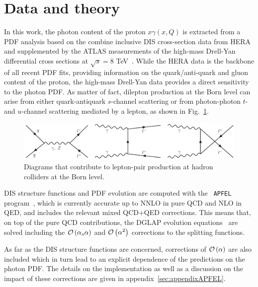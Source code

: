 \section{Data and theory}
\label{sec:theory}

In this work, the photon content of the proton $x\gamma(x,Q)$ is
extracted from a PDF analysis based on the combine inclusive DIS
cross-section data from HERA~\cite{Abramowicz:2015mha} and
supplemented by the ATLAS measurements of the high-mass Drell-Yan
differential cross sections at $\sqrt{s}=8$ TeV~\cite{Aad:2016zzw}.
%
While the HERA data is the backbone of all recent PDF fits, providing
information on the quark/anti-quark and gluon content of the proton,
the high-mass Drell-Yan data provides a direct sensitivity to the
photon PDF.
%
As matter of fact, dilepton production at the Born level can arise
from either quark-antiquark $s$-channel scattering or from
photon-photon $t$- and $u$-channel scattering mediated by a lepton, as
shown in Fig.~\ref{fig:photoninduced}.

\begin{figure}[t]
  \begin{center}
    \includegraphics[width=17cm]{figs/DYdiagrams.pdf}
    \end{center}
    \caption{Diagrams that contribute to lepton-pair production at
      hadron colliders at the Born level.}
\label{fig:photoninduced}
\end{figure}

DIS structure functions and PDF evolution are computed with the {\tt
  APFEL} program~\cite{Bertone:2013vaa}, which is currently accurate
up to NNLO in pure QCD and NLO in QED, and includes the relevant mixed
QCD+QED corrections. This means that, on top of the pure QCD
contributions, the DGLAP evolution
equations~\cite{Gribov:1972ri,Dokshitzer:1977,Altarelli:1977zs} are
solved including the $\mathcal{O}\left( \alpha_s\alpha\right)$ and
$\mathcal{O}\left( \alpha^2\right)$ corrections to the splitting functions.

As far as the DIS structure functions are concerned, corrections of
$\mathcal{O}\left( \alpha\right)$ are also included which in turn lead to an
explicit dependence of the predictions on the photon PDF.  The details
on the implementation as well as a discussion on the impact of these
corrections are given in appendix~\ref{sec:appendixAPFEL}.

